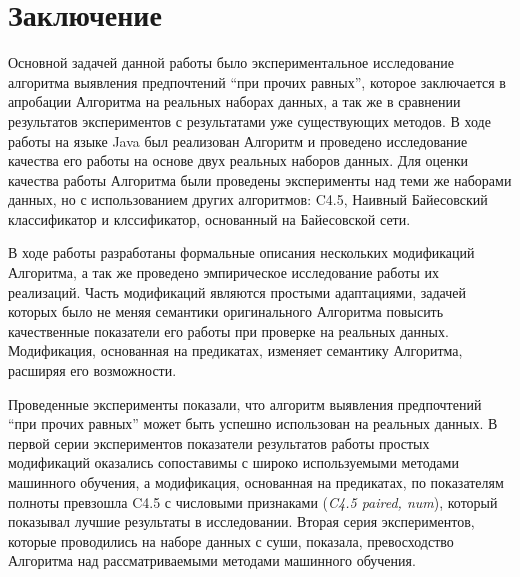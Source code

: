 \chapter*{Заключение}
\label{ch:ending}

Основной задачей данной работы было экспериментальное исследование алгоритма выявления предпочтений \enquote{при прочих равных}, которое заключается в апробации Алгоритма на реальных наборах данных, а так же в сравнении результатов экспериментов с результатами уже существующих методов. В ходе работы на языке Java был реализован Алгоритм и проведено исследование качества его работы на основе двух реальных наборов данных. Для оценки качества работы Алгоритма были проведены эксперименты над теми же наборами данных, но с использованием других алгоритмов: C4.5, Наивный Байесовский классификатор и клссификатор, основанный на Байесовской сети.

В ходе работы разработаны формальные описания нескольких модификаций Алгоритма, а так же проведено эмпирическое исследование работы их реализаций. Часть модификаций являются простыми адаптациями, задачей которых было не меняя семантики оригинального Алгоритма повысить качественные показатели его работы при проверке на реальных данных. Модификация, основанная на предикатах, изменяет семантику Алгоритма, расширяя его возможности. 

Проведенные эксперименты показали, что алгоритм выявления предпочтений \enquote{при прочих равных} может быть успешно использован на реальных данных. В первой серии экспериментов показатели результатов работы простых модификаций оказались сопоставимы с широко используемыми методами машинного обучения, а модификация, основанная на предикатах, по показателям полноты превзошла C4.5 с числовыми признаками (\emph{C4.5 paired, num}), который показывал лучшие результаты в исследовании. Вторая серия экспериментов, которые проводились на наборе данных с суши, показала, превосходство Алгоритма над рассматриваемыми методами машинного обучения. 